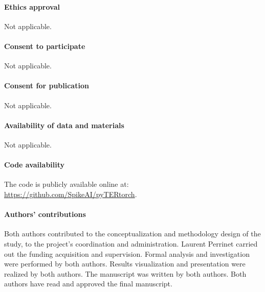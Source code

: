 \documentclass[default]{sn-jnl}%
\theoremstyle{thmstyleone}%
\theoremstyle{thmstyletwo}%
\theoremstyle{thmstylethree}%
\begin{document}
\paragraph{Ethics approval}
Not applicable.

\paragraph{Consent to participate}
Not applicable.

\paragraph{Consent for publication}
Not applicable.

\paragraph{Availability of data and materials}
Not applicable.

\paragraph{Code availability}
%
The code is publicly available online at: \url{https://github.com/SpikeAI/pyTERtorch}.
%   
\paragraph{Authors' contributions}
%
Both authors contributed to the conceptualization and methodology design of the study, to the project's coordination and administration. Laurent Perrinet carried out the funding acquisition and supervision. Formal analysis and investigation were performed by both authors. Results visualization and presentation were realized by both authors. The manuscript was written by both authors. Both authors have read and approved the final manuscript.


\end{document}
